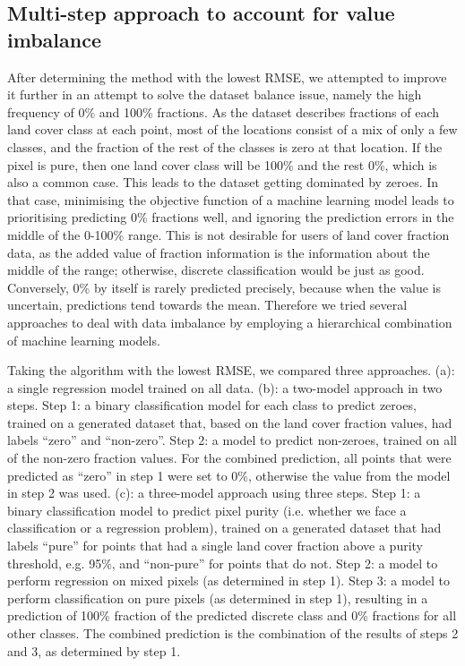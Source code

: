 \documentclass[review,authoryear,3p]{elsarticle}
\begin{document}
\subsection{Multi-step approach to account for value imbalance}
\label{sec-multistep}

After determining the method with the lowest \gls{RMSE}, we attempted to improve it further in an attempt to solve the dataset balance issue, namely the high frequency of 0\% and 100\% fractions.
As the dataset describes fractions of each land cover class at each point, most of the locations consist of a mix of only a few classes, and the fraction of the rest of the classes is zero at that location.
If the pixel is pure, then one land cover class will be 100\% and the rest 0\%, which is also a common case.
This leads to the dataset getting dominated by zeroes.
In that case, minimising the objective function of a machine learning model leads to prioritising predicting 0\% fractions well, and ignoring the prediction errors in the middle of the 0-100\% range.
This is not desirable for users of land cover fraction data, as the added value of fraction information is the information about the middle of the range; otherwise, discrete classification would be just as good.
Conversely, 0\% by itself is rarely predicted precisely, because when the value is uncertain, predictions tend towards the mean.
Therefore we tried several approaches to deal with data imbalance by employing a hierarchical combination of machine learning models.

Taking the algorithm with the lowest \gls{RMSE}, we compared three approaches.
(a): a single regression model trained on all data.
(b): a two-model approach in two steps.
Step 1: a binary classification model for each class to predict zeroes, trained on a generated dataset that, based on the land cover fraction values, had labels ``zero'' and ``non-zero''.
Step 2: a model to predict non-zeroes, trained on all of the non-zero fraction values.
For the combined prediction, all points that were predicted as ``zero'' in step 1 were set to 0\%, otherwise the value from the model in step 2 was used.
(c): a three-model approach using three steps.
Step 1: a binary classification model to predict pixel purity (i.e. whether we face a classification or a regression problem), trained on a generated dataset that had labels ``pure'' for points that had a single land cover fraction above a purity threshold, e.g. 95\%, and ``non-pure'' for points that do not.
Step 2: a model to perform regression on mixed pixels (as determined in step 1).
Step 3: a model to perform classification on pure pixels (as determined in step 1), resulting in a prediction of 100\% fraction of the predicted discrete class and 0\% fractions for all other classes.
The combined prediction is the combination of the results of steps 2 and 3, as determined by step 1.
\end{document}
